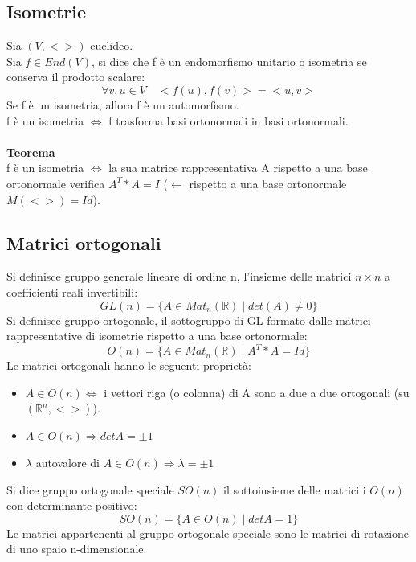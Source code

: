 \documentclass{article}
\newcommand{\R}{\mathds{R}}
\begin{document}
\subsection{Isometrie}
Sia $(V,<>)$ euclideo.\\
Sia $f\in End(V)$, si dice che f è un endomorfismo unitario o isometria se conserva il prodotto scalare:
$$\forall v,u\in V\quad <f(u),f(v)>=<u,v> $$
Se f è un isometria, allora f è un automorfismo.\\
f è un isometria $\Leftrightarrow$ f trasforma basi ortonormali in basi ortonormali.\\\\
\textbf{Teorema}\\
f è un isometria $\Leftrightarrow$ la sua matrice rappresentativa A rispetto a una base ortonormale verifica $A^T*A=I$ ($\leftarrow$ rispetto a una base ortonormale $M(<>)=Id$).

\subsection{Matrici ortogonali}
Si definisce gruppo generale lineare di ordine n, l'insieme delle matrici $n\times n$ a coefficienti reali invertibili: $$GL(n)=\{A\in Mat_n(\R)\;|\;det(A)\neq0\}$$
Si definisce gruppo ortogonale, il sottogruppo di GL formato dalle matrici rappresentative di isometrie rispetto a una base ortonormale:
$$O(n)=\{A\in Mat_n(\R)\;|\;A^T*A=Id\} $$
Le matrici ortogonali hanno le seguenti proprietà:
\begin{itemize}
    \item $A\in O(n)\Leftrightarrow$ i vettori riga (o colonna) di A sono a due a due ortogonali (su $(\R^n,<>)$).
    \item $A\in O(n)\Rightarrow detA=\pm 1$
    \item $\lambda$ autovalore di $A\in O(n)\Rightarrow \lambda=\pm 1$
\end{itemize}
Si dice gruppo ortogonale speciale $SO(n)$ il sottoinsieme delle matrici i $O(n)$ con determinante positivo:
$$SO(n)=\{A\in O(n)\;|\;detA=1\} $$
Le matrici appartenenti al gruppo ortogonale speciale sono le matrici di rotazione di uno spaio n-dimensionale.








\newpage
\renewcommand*\contentsname{Indice}
\tableofcontents
\end{document}
